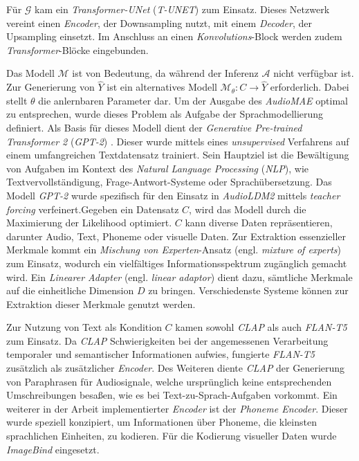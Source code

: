 \documentclass[
  a4paper,  %
  twoside,  %
  bibliography=totoc,
  headsepline,
  cleardoublepage=empty,
  parskip=half,
  draft=false
]{scrbook}
\begin{document}
Für $\mathcal{G}$ kam ein \emph{Transformer-UNet} (\emph{T-UNET}) zum Einsatz. Dieses Netzwerk vereint einen \emph{Encoder}, der Downsampling nutzt, mit einem \emph{Decoder}, der Upsampling einsetzt. Im Anschluss an einen \emph{Konvolutions}-Block werden zudem \emph{Transformer}-Blöcke eingebunden. \cite{liu_audioldm2_2023}

Das Modell $\mathcal{M}$ ist von Bedeutung, da während der Inferenz $\mathcal{A}$ nicht verfügbar ist. Zur Generierung von $\hat{Y}$ ist ein alternatives Modell $\mathcal{M}_\theta: C \rightarrow \hat{Y}$ erforderlich. Dabei stellt $\theta$ die anlernbaren Parameter dar. Um der Ausgabe des \emph{AudioMAE} optimal zu entsprechen, wurde dieses Problem als Aufgabe der Sprachmodellierung definiert. Als Basis für dieses Modell dient der \emph{Generative Pre-trained Transformer 2} (\emph{GPT-2}) \cite{alec_radford_jeff_wu_rewon_child_david_luan_dario_amodei_ilya_sutskever_language_2019}. Dieser wurde mittels eines \emph{unsupervised} Verfahrens auf einem umfangreichen Textdatensatz trainiert. Sein Hauptziel ist die Bewältigung von Aufgaben im Kontext des \emph{Natural Language Processing} (\emph{NLP}), wie Textvervollständigung, Frage-Antwort-Systeme oder Sprachübersetzung. Das Modell \emph{GPT-2} wurde spezifisch für den Einsatz in \emph{AudioLDM2} mittels \emph{teacher forcing} \cite{kolen_field_2001} verfeinert.Gegeben ein Datensatz $C$, wird das Modell durch die Maximierung der Likelihood optimiert. $C$ kann diverse Daten repräsentieren, darunter Audio, Text, Phoneme oder visuelle Daten. Zur Extraktion essenzieller Merkmale kommt ein \emph{Mischung von Experten}-Ansatz (engl. \emph{mixture of experts}) \cite{masoudnia_mixture_2014} zum Einsatz, wodurch ein vielfältiges Informationsspektrum zugänglich gemacht wird. Ein \emph{Linearer Adapter} (engl. \emph{linear adaptor}) dient dazu, sämtliche Merkmale auf die einheitliche Dimension $D$ zu bringen. Verschiedenste Systeme können zur Extraktion dieser Merkmale genutzt werden. \cite{liu_audioldm2_2023}

Zur Nutzung von Text als Kondition $C$ kamen sowohl \emph{CLAP} \cite{wu_large-scale_2023} als auch \emph{FLAN-T5} \cite{chung_scaling_2022} zum Einsatz. Da \emph{CLAP} Schwierigkeiten bei der angemessenen Verarbeitung temporaler und semantischer Informationen aufwies, fungierte \emph{FLAN-T5} zusätzlich als zusätzlicher \emph{Encoder}. Des Weiteren diente \emph{CLAP} der Generierung von Paraphrasen für Audiosignale, welche ursprünglich keine entsprechenden Umschreibungen besaßen, wie es bei Text-zu-Sprach-Aufgaben vorkommt. Ein weiterer in der Arbeit implementierter \emph{Encoder} ist der \emph{Phoneme Encoder}. Dieser wurde speziell konzipiert, um Informationen über Phoneme, die kleinsten sprachlichen Einheiten, zu kodieren. Für die Kodierung visueller Daten wurde \emph{ImageBind} \cite{girdhar_imagebind_2023} eingesetzt. \cite{liu_audioldm2_2023}
\end{document}
